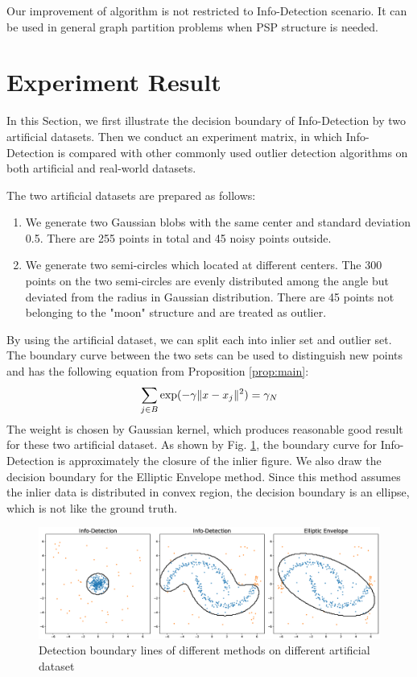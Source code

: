 \documentclass[runningheads]{llncs}
\begin{document}
Our improvement of algorithm is not restricted to Info-Detection scenario. It can be used in general graph partition problems when PSP structure is needed.

\section{Experiment Result}\label{sec:Experiemt}
In this Section, we first illustrate the decision boundary of Info-Detection by two artificial datasets. Then we conduct an experiment matrix, in which Info-Detection is compared with other commonly used outlier detection algorithms on both artificial and real-world datasets.

The two artificial datasets are prepared as follows:
\begin{enumerate}
\item We generate two Gaussian blobs with the same center and standard deviation 0.5. There are 255 points in total and 45 noisy points outside.
\item We generate two semi-circles which located at different centers. The 300 points on the two semi-circles are evenly distributed among the angle but deviated from the radius in Gaussian distribution. There are 45 points not belonging to the "moon" structure and are treated as outlier.
\end{enumerate}

By using the artificial dataset, we can split each into inlier set and outlier set. The boundary curve between the two sets can be used to distinguish new points and has the following equation from Proposition \ref{prop:main}:
\begin{equation}
\sum_{j \in B} \exp(-\gamma \lVert x - x_j\rVert^2)= \gamma_N
\end{equation}
The weight is chosen by Gaussian kernel, which produces reasonable good result for these two artificial dataset. As shown by Fig. \ref{fig:boundary}, the boundary curve for Info-Detection is approximately the closure of the inlier figure. We also draw the decision boundary for the Elliptic Envelope method. Since this method assumes the inlier data is distributed in convex region, the decision boundary is an ellipse, which is not like the ground truth.
\begin{figure}[!ht]
	\centering
	\includegraphics[width=\textwidth]{pic/outlier_boundary_illustration.eps}
	\caption{Detection boundary lines of different methods on different artificial dataset}	\label{fig:boundary}
\end{figure}
\end{document}
